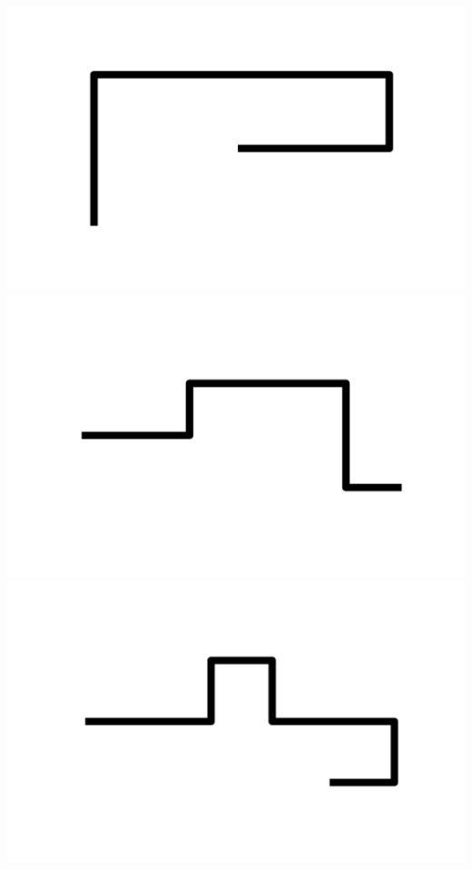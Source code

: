 \documentclass[]{report}
\begin{document}
\includegraphics[scale=.1]{pictures/21/state_cluster_shapes_274.pdf} 
\includegraphics[scale=.1]{pictures/21/state_cluster_shapes_275.pdf} 
\includegraphics[scale=.1]{pictures/21/state_cluster_shapes_276.pdf} 
\end{document}
